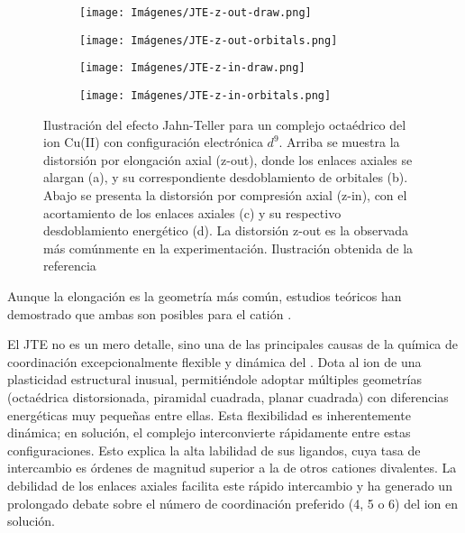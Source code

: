 \begin{figure}[H]
    \centering
    
    \begin{subfigure}{0.2\textwidth}
        \centering
        \texttt{[image: Imágenes/JTE-z-out-draw.png]}
        \caption{}
    \end{subfigure}
    \begin{subfigure}{0.2\textwidth}
        \centering
        \texttt{[image: Imágenes/JTE-z-out-orbitals.png]}
        \caption{}
    \end{subfigure}
    
    \vspace{0.5cm} %
    
    \begin{subfigure}{0.3\textwidth}
        \centering
        \texttt{[image: Imágenes/JTE-z-in-draw.png]}
        \caption{}
    \end{subfigure}
    \begin{subfigure}{0.2\textwidth}
        \centering
        \texttt{[image: Imágenes/JTE-z-in-orbitals.png]}
        \caption{}
    \end{subfigure}
    
    \caption[Ilustración del efecto Jahn-Teller ]{Ilustración  del efecto Jahn-Teller para un complejo octaédrico del ion Cu(II) con configuración electrónica $d^9$. Arriba se muestra la distorsión por elongación axial (z-out), donde los enlaces axiales se alargan (a), y su correspondiente desdoblamiento de orbitales (b). Abajo se presenta la distorsión por compresión axial (z-in), con el acortamiento de los enlaces axiales (c) y su respectivo desdoblamiento energético (d). La distorsión z-out es la observada más comúnmente en la experimentación. Ilustración obtenida de la referencia \cite{Cu-2019-01}}
    \label{fig:jahn_teller_d9}
\end{figure}


Aunque la elongación es la geometría más común, estudios teóricos han demostrado que ambas son posibles para el catión  \cite{Cu-2019-01}.

El JTE no es un mero detalle, sino una de las principales causas de la química de coordinación excepcionalmente flexible y dinámica del . Dota al ion de una plasticidad estructural inusual, permitiéndole adoptar múltiples geometrías (octaédrica distorsionada, piramidal cuadrada, planar cuadrada) con diferencias energéticas muy pequeñas entre ellas. Esta flexibilidad es inherentemente dinámica; en solución, el complejo interconvierte rápidamente entre estas configuraciones. Esto explica la alta labilidad de sus ligandos, cuya tasa de intercambio es órdenes de magnitud superior a la de otros cationes divalentes. La debilidad de los enlaces axiales facilita este rápido intercambio y ha generado un prolongado debate sobre el número de coordinación preferido (4, 5 o 6) del ion en solución.

